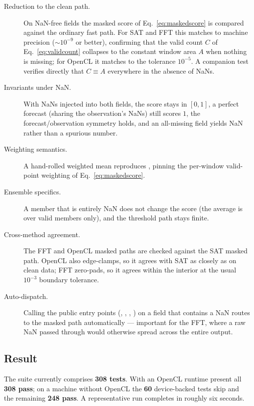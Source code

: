 \begin{description}
  \item[Reduction to the clean path.] On NaN-free fields the masked score of
        Eq.~\eqref{eq:maskedscore} is compared against the ordinary fast path.
        For SAT and FFT this matches to machine precision ($\sim 10^{-9}$ or
        better), confirming that the valid count $C$ of
        Eq.~\eqref{eq:validcount} collapses to the constant window area $A$ when
        nothing is missing; for OpenCL it matches to the 
        tolerance $10^{-5}$. A companion test verifies directly that
        $C \equiv A$ everywhere in the absence of NaNs.
  \item[Invariants under NaN.] With NaNs injected into both fields, the score
        stays in $[0,1]$, a perfect forecast (sharing the observation's NaNs)
        still scores $1$, the forecast/observation symmetry holds, and an
        all-missing field yields NaN rather than a spurious number.
  \item[Weighting semantics.] A hand-rolled weighted mean reproduces
        , pinning the per-window valid-point
        weighting of Eq.~\eqref{eq:maskedscore}.
  \item[Ensemble specifics.] A member that is entirely NaN does not change the
        score (the average is over valid members only), and the
         threshold path stays finite.
  \item[Cross-method agreement.] The FFT and OpenCL masked paths are checked
        against the SAT masked path. OpenCL also edge-clamps, so it agrees with
        SAT as closely as on clean data; FFT zero-pads, so it agrees within the
        interior at the usual $10^{-3}$ boundary tolerance.
  \item[Auto-dispatch.] Calling the public entry points
        (, ,
        , ) on a field that
        contains a NaN routes to the masked path automatically --- important for
        the FFT, where a raw NaN passed through  would
        otherwise spread across the entire output.
\end{description}

\subsection{Result}
\label{sec:tests-result}

The suite currently comprises \textbf{308 tests}. With an OpenCL runtime present
all \textbf{308 pass}; on a machine without OpenCL the \textbf{60} device-backed
tests skip and the remaining \textbf{248 pass}. A representative run completes in
roughly six seconds.
